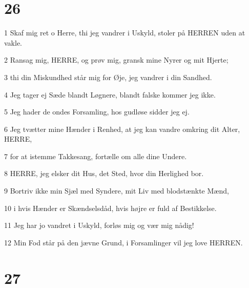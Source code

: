 \chapter{26}

\par 1 Skaf mig ret o Herre, thi jeg vandrer i Uskyld, stoler på HERREN uden at vakle.
\par 2 Ransag mig, HERRE, og prøv mig, gransk mine Nyrer og mit Hjerte;
\par 3 thi din Miskundhed står mig for Øje, jeg vandrer i din Sandhed.
\par 4 Jeg tager ej Sæde blandt Løgnere, blandt falske kommer jeg ikke.
\par 5 Jeg hader de ondes Forsamling, hos gudløse sidder jeg ej.
\par 6 Jeg tvætter mine Hænder i Renhed, at jeg kan vandre omkring dit Alter, HERRE,
\par 7 for at istemme Takkesang, fortælle om alle dine Undere.
\par 8 HERRE, jeg elsker dit Hus, det Sted, hvor din Herlighed bor.
\par 9 Bortriv ikke min Sjæl med Syndere, mit Liv med blodstænkte Mænd,
\par 10 i hvis Hænder er Skændselsdåd, hvis højre er fuld af Bestikkelse.
\par 11 Jeg har jo vandret i Uskyld, forløs mig og vær mig nådig!
\par 12 Min Fod står på den jævne Grund, i Forsamlinger vil jeg love HERREN.

\chapter{27}

